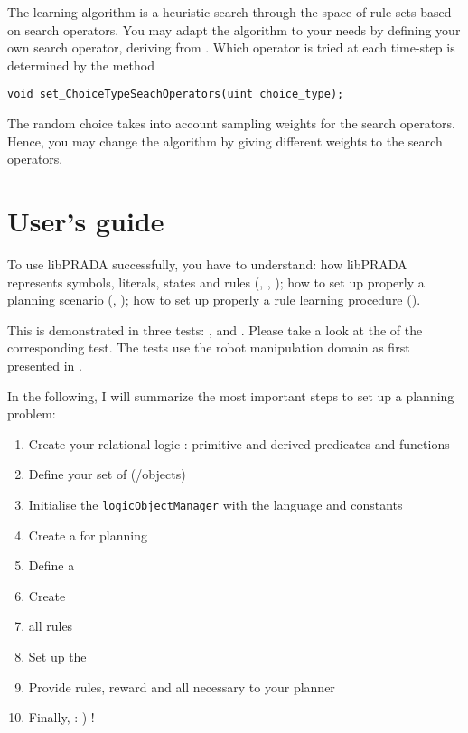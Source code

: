 \documentclass[10pt,twoside,twocolumn,fleqn]{article}
\begin{document}
The learning algorithm is a heuristic search through the space of
rule-sets based on search operators. You may adapt the algorithm to your
needs by defining your own search operator, deriving from
. Which operator is tried at each time-step is
determined by the method
\begin{lstlisting}
void set_ChoiceTypeSeachOperators(uint choice_type);
\end{lstlisting}
The random choice takes into account sampling weights for the search
operators. Hence, you may change the algorithm by giving different weights
to the search operators.





\section{User's guide}

To use libPRADA successfully, you have to understand:  how
libPRADA represents symbols, literals, states and rules
(, ,
);  how to set up properly a planning
scenario (, );
 how to set up properly a rule learning procedure
().

This is demonstrated in three tests: ,
 and . Please
take a look at the  of the corresponding test.  The tests
use the robot manipulation domain as first presented in
\cite{lang-toussaint-10jair}.

In the following, I will summarize the most important steps to set up a
planning problem:
\begin{enumerate}
\item Create your relational logic : primitive and derived
predicates and functions
\item Define your set of  (/objects)
\item Initialise the \texttt{logicObjectManager} with the language and constants
\item Create a  for planning
\item Define a 
\item Create 
\item {} all rules
\item Set up the 
\item Provide rules, reward and all necessary  to your planner
\item Finally,  :-) !
\end{enumerate}
\end{document}
